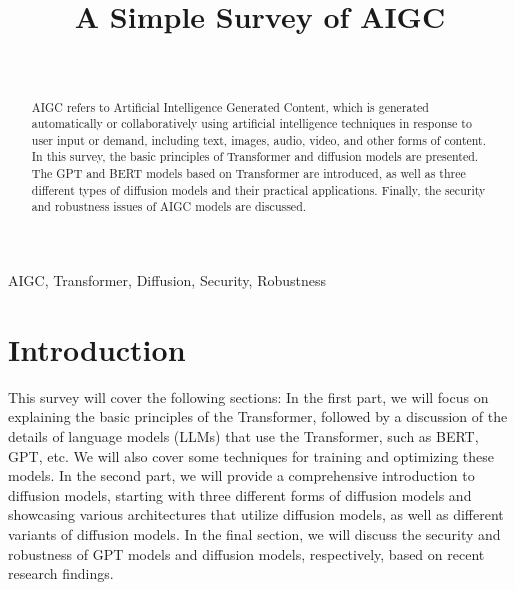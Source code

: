 \documentclass{IEEEtran}
\begin{document}
\title{A Simple Survey of AIGC\\
}

\author{\\
}

\maketitle

\begin{abstract}
AIGC refers to Artificial Intelligence Generated Content, 
which is generated automatically or collaboratively using 
artificial intelligence techniques in response to user input 
or demand, including text, images, audio, video, and other forms 
of content. In this survey, the basic principles of Transformer 
and diffusion models are presented. The GPT and BERT models 
based on Transformer are introduced, as well as three different 
types of diffusion models and their practical applications. 
Finally, the security and robustness issues of AIGC models are 
discussed.
\end{abstract}

\begin{IEEEkeywords}
AIGC, Transformer, Diffusion, Security, Robustness
\end{IEEEkeywords}

\section{Introduction}
This survey will cover the following sections: In the first part, 
we will focus on explaining the basic principles of the Transformer, 
followed by a discussion of the details of language models (LLMs) 
that use the Transformer, such as BERT, GPT, etc. 
We will also cover some techniques for training and optimizing 
these models. In the second part, we will provide a comprehensive 
introduction to diffusion models, starting with three different forms 
of diffusion models and showcasing various architectures that utilize 
diffusion models, as well as different variants of diffusion models. 
In the final section, we will discuss the security and 
robustness of GPT models and diffusion models, respectively, 
based on recent research findings.
\end{document}
